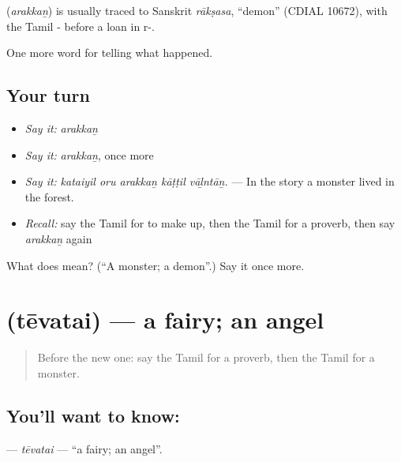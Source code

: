 \begin{cousinweb}
\textbf{} (\emph{arakkaṉ}) is usually traced to Sanskrit \emph{rākṣasa}, \textquotedblleft{}demon\textquotedblright{} (CDIAL 10672), with the Tamil - before a loan in r-.
\end{cousinweb}

\begin{grammarlens}[title={What you've built}]
One more word for telling what happened.
\end{grammarlens}

\subsection*{Your turn}
\begin{itemize}
\raggedright
  \item \emph{Say it:} \emph{arakkaṉ}
  \item \emph{Say it:} \emph{arakkaṉ}, once more
  \item \emph{Say it:} \emph{kataiyil oru arakkaṉ kāṭṭil vāḻntāṉ.} — In the story a monster lived in the forest.
  \item \emph{Recall:} say the Tamil for to make up, then the Tamil for a proverb, then say \emph{arakkaṉ} again
\end{itemize}

\begin{tcolorbox}[breakable,colback=teal!4,colframe=teal!35!black,title={Before you move on}]
What does  mean? (\textquotedblleft{}A monster; a demon\textquotedblright{}.) Say it once more.
\end{tcolorbox}
\section[\texorpdfstring{\ta{தேவதை} (tēvatai)}{தேவதை (tēvatai)}]{ (tēvatai) — a fairy; an angel}

\label{lesson:TA-C344-tevatai}



\begin{quote}
Before the new one: say the Tamil for a proverb, then the Tamil for a monster.
\end{quote}

\subsection*{You'll want to know: }
\textbf{} — \emph{tēvatai} — \textquotedblleft{}a fairy; an angel\textquotedblright{}.

